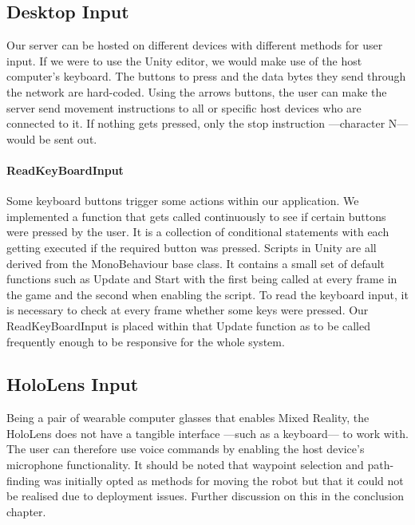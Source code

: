 \subsection{Desktop Input}
Our server can be hosted on different devices with different methods for user input. If we were to use the Unity editor, we would make use of the host computer's keyboard. The buttons to press and the data bytes they send through the network are hard-coded. Using the arrows buttons, the user can make the server send movement instructions to all or specific host devices who are connected to it. If nothing gets pressed, only the stop instruction ---character N--- would be sent out.

\paragraph{ReadKeyBoardInput}
Some keyboard buttons trigger some actions within our application. We implemented a function that gets called continuously to see if certain buttons were pressed by the user. It is a collection of conditional statements with each getting executed if the required button was pressed. 
Scripts in Unity are all derived from the MonoBehaviour base class. It contains a small set of default functions such as Update and Start with the first being called at every frame in the game and the second when enabling the script. To read the keyboard input, it is necessary to check at every frame whether some keys were pressed. Our ReadKeyBoardInput is placed within that Update function as to be called frequently enough to be responsive for the whole system.



\subsection{HoloLens Input}
Being a pair of wearable computer glasses that enables Mixed Reality, the HoloLens does not have a tangible interface ---such as a keyboard--- to work with. The user can therefore use voice commands by enabling the host device's microphone functionality. It should be noted that waypoint selection and path-finding was initially opted as methods for moving the robot but that it could not be realised due to deployment issues. Further discussion on this in the conclusion chapter.


